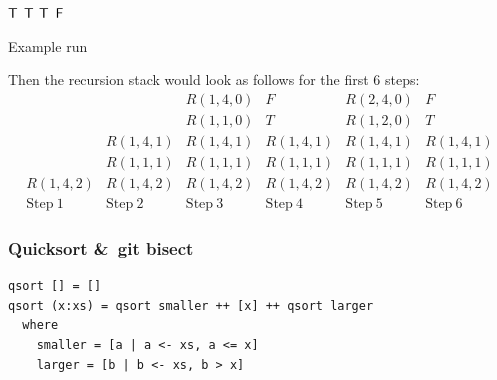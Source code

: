 \begin{frame}
\begin{algorithmic}[1]
		\RETURN $\mathsf{T}$
		\RETURN $\mathsf{T}$
	\ENDIF
\ELSE 
			\RETURN $\mathsf{T}$
		\ENDIF
	\ENDFOR
\ENDIF
\RETURN $\mathsf{F}$
\end{algorithmic}
\end{frame}

\begin{frame}
{Example run}


Then the recursion stack would look as follows for the first 6 steps:
$$
\begin{array}{c|c|c|c|c|c}
				 &          & R(1,4,0) &    F     & R(2,4,0) &    F     \\
				 &          & R(1,1,0) &    T     & R(1,2,0) &    T     \\
				 & R(1,4,1) & R(1,4,1) & R(1,4,1) & R(1,4,1) & R(1,4,1) \\
         & R(1,1,1) & R(1,1,1) & R(1,1,1) & R(1,1,1) & R(1,1,1) \\
R(1,4,2) & R(1,4,2) & R(1,4,2) & R(1,4,2) & R(1,4,2) & R(1,4,2) \\\hline
\mathrm{Step\ 1} & \mathrm{Step\ 2} & \mathrm{Step\ 3} & \mathrm{Step\ 4} 
& \mathrm{Step\ 5} & \mathrm{Step\ 6} 
\end{array}
$$
\end{frame}

\begin{frame}[fragile]\frametitle{Quicksort \&\ git bisect}

\begin{verbatim}
qsort [] = []
qsort (x:xs) = qsort smaller ++ [x] ++ qsort larger
  where
    smaller = [a | a <- xs, a <= x]
    larger = [b | b <- xs, b > x]
\end{verbatim}
\end{frame}


